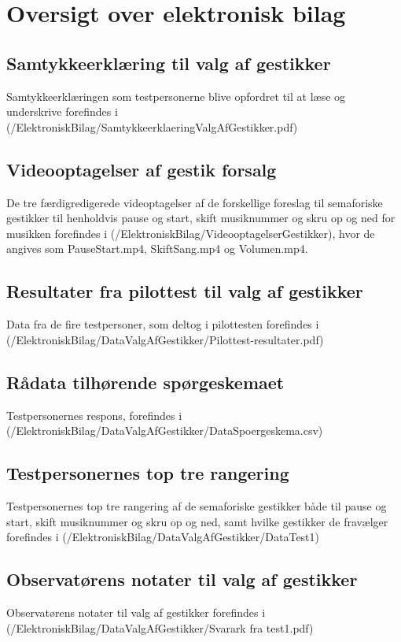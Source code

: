 \chapter{Oversigt over elektronisk bilag}
\label{app:OversigtOverElektroniskBilag}
%
%
\section{Samtykkeerklæring til valg af gestikker}
\label{app:SamtykkeerklaeringValgAfGestikker}
%
Samtykkeerklæringen som testpersonerne blive opfordret til at læse og underskrive forefindes i (/ElektroniskBilag/SamtykkeerklaeringValgAfGestikker.pdf)
%
\section{Videooptagelser af gestik forsalg}
\label{app:VideooptagelseGestikForslag}
%
De tre færdigredigerede videoptagelser af de forskellige foreslag til semaforiske gestikker til henholdvis pause og start, skift musiknummer og skru op og ned for musikken forefindes i (/ElektroniskBilag/VideooptagelserGestikker), hvor de angives som PauseStart.mp4, SkiftSang.mp4 og Volumen.mp4.
%
\section{Resultater fra pilottest til valg af gestikker}
\label{app:ResultaterPilottestValgAfGestikker}
%
Data fra de fire testpersoner, som deltog i pilottesten forefindes i \\
(/ElektroniskBilag/DataValgAfGestikker/Pilottest-resultater.pdf)
%
\section{Rådata tilhørende spørgeskemaet}
\label{app:RaaDataSpoergeskema}
%
Testpersonernes respons, forefindes i (/ElektroniskBilag/DataValgAfGestikker/DataSpoergeskema.csv)
%
\section{Testpersonernes top tre rangering}
\label{app:TestpersonernesTopTre}
%
Testpersonernes top tre rangering af de semaforiske gestikker både til pause og start, skift musiknummer og skru op og ned, samt hvilke gestikker de fravælger forefindes i (/ElektroniskBilag/DataValgAfGestikker/DataTest1)
%
\section{Observatørens notater til valg af gestikker}
\label{app:NoterValgAfGestikker}
%
Observatørens notater til valg af gestikker forefindes i (/ElektroniskBilag/DataValgAfGestikker/Svarark fra test1.pdf)
%
